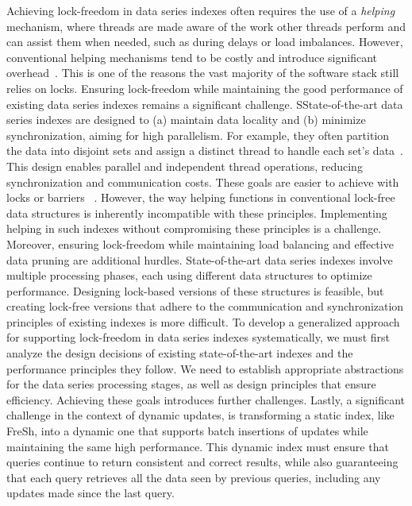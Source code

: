 \documentclass[a4paper,11pt,twoside,openany]{book}
\begin{document}
Achieving lock-freedom in data series indexes often requires the use of a {\em helping} mechanism,
where threads are made aware of the work other threads perform and can assist them when
needed, such as during delays or load imbalances. However, conventional helping mechanisms
tend to be costly and introduce significant overhead~\cite{F04,HS08,7515610,Williams2012CCI}.
This is one of the reasons the vast majority of the software stack still relies on locks.
Ensuring lock-freedom while maintaining the good performance of existing data series indexes 
remains a significant challenge.
%
SState-of-the-art data series indexes are designed to (a) maintain data locality
and (b) minimize synchronization, aiming for high parallelism. 
For example, they often partition the data into disjoint sets and assign a distinct thread to 
handle each set's data~\cite{parisplus,PFP21-I,PFP21-II}.
This design enables parallel and independent thread operations, reducing synchronization
and communication costs. These goals are easier to achieve with locks or barriers
~\cite{peng2018paris,peng2020messi,PFP21-I,PFP21-II}.
%
However, the way helping functions in conventional lock-free data structures is inherently
incompatible with these principles. Implementing helping in such indexes without compromising
these principles is a challenge.
%
Moreover, ensuring lock-freedom while maintaining load balancing and effective data pruning
are additional hurdles. State-of-the-art data series indexes involve multiple processing phases,
each using different data structures to optimize performance. Designing lock-based versions of
these structures is feasible, but creating lock-free versions that adhere to the communication
and synchronization principles of existing indexes is more difficult.
%
To develop a generalized approach for supporting lock-freedom in data series indexes systematically,
we must first analyze the design decisions of existing state-of-the-art indexes and the performance
principles they follow. We need to establish appropriate abstractions for the data series processing
stages, as well as design principles that ensure efficiency. Achieving these goals introduces further
challenges.
%
Lastly, a significant challenge in the context of dynamic updates, is transforming
a static index, like FreSh, into a dynamic one that supports batch insertions of updates while 
maintaining the same high performance. This dynamic index must ensure that queries continue to 
return consistent and correct results, while also guaranteeing that each query retrieves all the 
data seen by previous queries, including any updates made since the last query.
\end{document}
